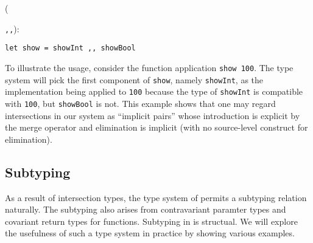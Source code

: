 ({\lstinline{,,}):
\begin{lstlisting}
let show = showInt ,, showBool
\end{lstlisting}

To illustrate the usage, consider the function application \lstinline{show 100}.
The type system will pick the first component of \lstinline{show}, namely
\lstinline{showInt}, as the implementation being applied to \lstinline{100}
because the type of \lstinline{showInt} is compatible with \lstinline{100}, but
\lstinline{showBool} is not. This example shows that one may regard
intersections in our system as ``implicit pairs'' whose introduction is explicit
by the merge operator and elimination is implicit (with no source-level
construct for elimination).








\subsection{Subtyping}

As a result of intersection types, the type system of \name permits a subtyping
relation naturally. The subtyping also arises from contravariant paramter types
and covariant return types for functions. Subtyping in \name is structual. We
will explore the usefulness of such a type system in practice by showing various
examples.

}

